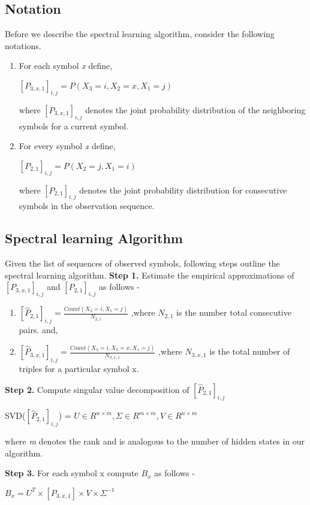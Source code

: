 \documentclass{article} %
\begin{document}
\subsection{Notation}
Before we describe the spectral learning algorithm, consider the following notations.
\begin{enumerate}
\item For each symbol \textit{x} define, 
\begin{center}
$[P_{3,x,1}]_{i,j} = P(X_3 = i, X_2 = x, X_1 = j)$
\end{center}
where $[P_{3,x,1}]_{i,j}$ denotes the joint probability distribution of the neighboring symbols for a current symbol.
\item For every symbol \textit{x} define,
\begin{center}
$[P_{2,1}]_{i,j} = P(X_2 = j, X_1 = i)$
\end{center}
where $[P_{2,1}]_{i,j}$ denotes the joint probability distribution for consecutive symbols in the observation sequence.
\end{enumerate}
\subsection{Spectral learning Algorithm}
Given the list of sequences of observed symbols, following steps outline the spectral learning algorithm.
\newline
\newline
\textbf{Step 1.} Estimate the empirical approximations of $[P_{3,x,1}]_{i,j}$ and $[P_{2,1}]_{i,j}$ as follows - 
\begin{enumerate}
 \item $[\hat{P}_{2,1}]_{i,j} = \frac{Count(X_2 = i, X_1 = j)}{N_{2,1}}$ ,where $N_{2,1}$ is the number total consecutive pairs. and,
\item $[\hat{P}_{3,x,1}]_{i,j} = \frac{Count(X_3 = i, X_2 = x, X_1 = j)}{N_{3,x,1}}$ ,where $N_{3,x,1}$ is the total number of triples for a particular symbol x.
\end{enumerate}

\textbf{Step 2.} Compute singular value decomposition of $[\hat{P}_{2,1}]_{i,j}$ 
\begin{center} SVD($[\hat{P}_{2,1}]_{i,j}$) = $U \in R^{n\times m} ,  \Sigma \in R^{m\times m} , V \in R^{n \times m}$
\end{center}
where \textit{m} denotes the rank and is analogous to the number of hidden states in our algorithm.

\textbf{Step 3.} For each symbol x compute $B_x$ as follows -
\begin{center}
$B_x = U^T \times [P_{3,x,1}] \times V \times \Sigma^{-1}$
\end{center}
\end{document}
